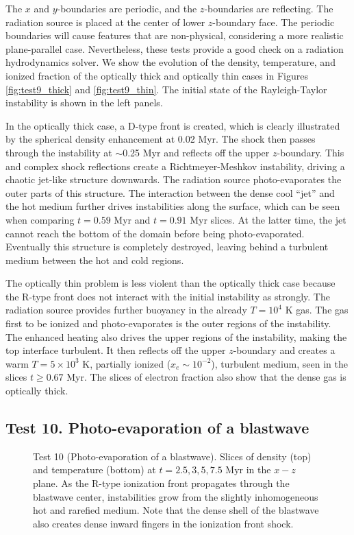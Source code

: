 \documentclass[apj,onecolumn]{emulateapj}
\begin{document}
The $x$ and $y$-boundaries are periodic, and the $z$-boundaries are
reflecting.  The radiation source is placed at the center of lower
$z$-boundary face.  The periodic boundaries will cause features that
are non-physical, considering a more realistic plane-parallel case.
Nevertheless, these tests provide a good check on a radiation
hydrodynamics solver.  We show the evolution of the density,
temperature, and ionized fraction of the optically thick and optically
thin cases in Figures \ref{fig:test9_thick} and \ref{fig:test9_thin}.
The initial state of the Rayleigh-Taylor instability is shown in the
left panels.

In the optically thick case, a D-type front is created, which is
clearly illustrated by the spherical density enhancement at 0.02 Myr.
The shock then passes through the instability at $\sim$0.25 Myr and
reflects off the upper $z$-boundary.  This and complex shock
reflections create a Richtmeyer-Meshkov instability, driving a chaotic
jet-like structure downwards.  The radiation source photo-evaporates
the outer parts of this structure.  The interaction between the dense
cool ``jet'' and the hot medium further drives instabilities along the
surface, which can be seen when comparing $t = 0.59$ Myr and $t =
0.91$ Myr slices.  At the latter time, the jet cannot reach the bottom
of the domain before being photo-evaporated.  Eventually this
structure is completely destroyed, leaving behind a turbulent medium
between the hot and cold regions.

The optically thin problem is less violent than the optically thick
case because the R-type front does not interact with the initial
instability as strongly.  The radiation source provides further
buoyancy in the already $T=10^4$ K gas.  The gas first to be ionized
and photo-evaporates is the outer regions of the instability.  The
enhanced heating also drives the upper regions of the instability,
making the top interface turbulent.  It then reflects off the upper
$z$-boundary and creates a warm $T = 5 \times 10^3$ K, partially
ionized ($x_e \sim 10^{-2}$), turbulent medium, seen in the slices $t
\ge 0.67$ Myr.  The slices of electron fraction also show that the
dense gas is optically thick.

\subsection{Test 10. Photo-evaporation of a blastwave}

\begin{figure}[t]
  \caption{\label{fig:test10} Test 10 (Photo-evaporation of a
    blastwave).  Slices of density (top) and temperature (bottom) at
    $t = 2.5, 3, 5, 7.5$ Myr in the $x-z$ plane.  As the R-type
    ionization front propagates through the blastwave center,
    instabilities grow from the slightly inhomogeneous hot and rarefied
    medium.  Note that the dense shell of the blastwave also creates
    dense inward fingers in the ionization front shock.}
\end{figure}
\end{document}
